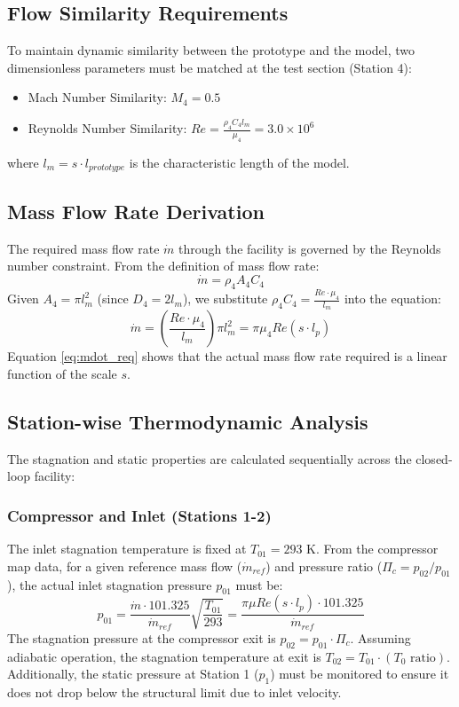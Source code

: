 \documentclass[12pt]{article}
\begin{document}
\subsection{Flow Similarity Requirements}
To maintain dynamic similarity between the prototype and the model, two dimensionless parameters must be matched at the test section (Station 4):
\begin{itemize}
    \item {Mach Number Similarity:} $M_4 = 0.5$
    \item {Reynolds Number Similarity:} $Re = \frac{\rho_4 C_4 l_{m}}{\mu_4} = 3.0 \times 10^6$
\end{itemize}
where $l_m = s \cdot l_{prototype}$ is the characteristic length of the model.

\subsection{Mass Flow Rate Derivation}
The required mass flow rate $\dot{m}$ through the facility is governed by the Reynolds number constraint. From the definition of mass flow rate:
\begin{equation}
    \dot{m} = \rho_4 A_4 C_4
\end{equation}
Given $A_4 = \pi l_m^2$ (since $D_4 = 2l_m$), we substitute $\rho_4 C_4 = \frac{Re \cdot \mu_4}{l_m}$ into the equation:
\begin{equation}
    \dot{m} = \left( \frac{Re \cdot \mu_4}{l_m} \right) \pi l_m^2 = \pi \mu_4 Re (s \cdot l_p)
    \label{eq:mdot_req}
\end{equation}
Equation \ref{eq:mdot_req} shows that the actual mass flow rate required is a linear function of the scale $s$.

\subsection{Station-wise Thermodynamic Analysis}
The stagnation and static properties are calculated sequentially across the closed-loop facility:

\subsubsection{Compressor and Inlet (Stations 1-2)}
The inlet stagnation temperature is fixed at $T_{01} = 293$ K. From the compressor map data, for a given reference mass flow ($\dot{m}_{ref}$) and pressure ratio ($\Pi_c = p_{02}/p_{01}$), the actual inlet stagnation pressure $p_{01}$ must be:
\begin{equation}
    p_{01} = \frac{\dot{m} \cdot 101.325}{\dot{m}_{ref}} \sqrt{\frac{T_{01}}{293}} = \frac{\pi \mu Re (s \cdot l_p) \cdot 101.325}{\dot{m}_{ref}}
\end{equation}
The stagnation pressure at the compressor exit is $p_{02} = p_{01} \cdot \Pi_c$. Assuming adiabatic operation, the stagnation temperature at exit is $T_{02} = T_{01} \cdot (\text{$T_{0}$ ratio})$. {Additionally, the static pressure at Station 1 ($p_1$) must be monitored to ensure it does not drop below the structural limit due to inlet velocity.}
\end{document}
